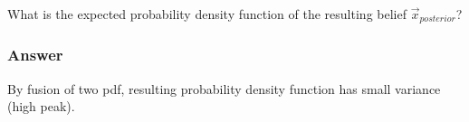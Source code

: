 \documentclass[12pt]{article}
\begin{document}
What is the expected probability density function of the resulting belief $\vec{x}_{posterior}$?

\subsubsection*{Answer}

By fusion of two pdf, resulting probability density function has small variance (high peak).

\begin{figure}[h]
\noindent{}
\end{figure}
\end{document}
